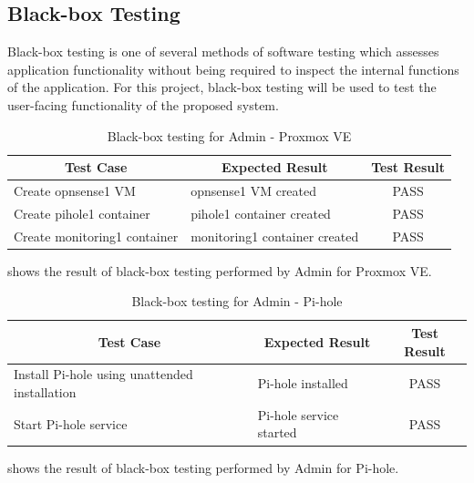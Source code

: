 \documentclass[../index.tex]{subfiles}
\begin{document}
\subsection{Black-box Testing}

Black-box testing is one of several methods of software testing which assesses application
functionality without being required to inspect the internal functions of the application. For this
project, black-box testing will be used to test the user-facing functionality of the proposed
system.

\begin{table}[h!]
  \begin{tabularx}{\textwidth}{|m{12em}|X|c|} 
    \hline
    \multicolumn{1}{|c|}{Test Case} & \multicolumn{1}{c|}{Expected Result} & \multicolumn{1}{c|}{Test Result} \\
    \hline
    Create opnsense1 VM             & opnsense1 VM created                 & PASS \\ 
    Create pihole1 container        & pihole1 container created            & PASS \\ 
    Create monitoring1 container    & monitoring1 container created        & PASS \\ 
    \hline
  \end{tabularx}
  \caption{Black-box testing for Admin - Proxmox VE}
  \label{table:blackbox_pve}
\end{table}

 shows the result of black-box testing performed by Admin for Proxmox VE.

\begin{table}[h!]
  \begin{tabularx}{\textwidth}{|m{12em}|X|c|} 
    \hline
    \multicolumn{1}{|c|}{Test Case} & \multicolumn{1}{c|}{Expected Result} & \multicolumn{1}{c|}{Test Result} \\
    \hline
    Install Pi-hole using unattended installation & Pi-hole installed      & PASS \\ 
    Start Pi-hole service           & Pi-hole service started              & PASS \\ 
    \hline
  \end{tabularx}
  \caption{Black-box testing for Admin - Pi-hole}
  \label{table:blackbox_pihole}
\end{table}

 shows the result of black-box testing performed by Admin for Pi-hole.
\end{document}
